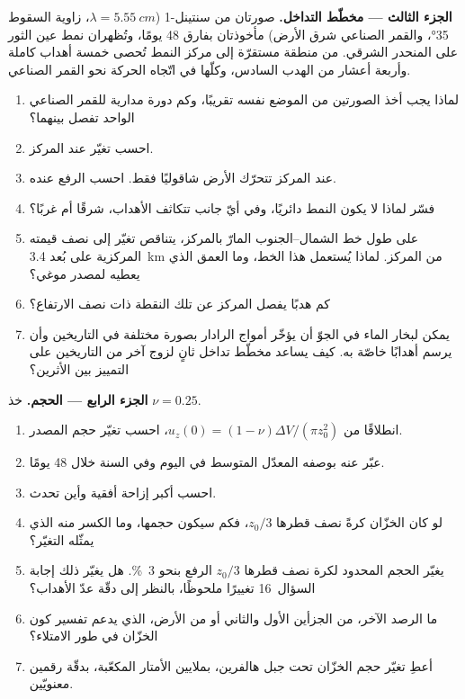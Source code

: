 \begin{problem}
\medskip\noindent\textbf{الجزء الثالث --- مخطّط التداخل.} صورتان من سنتينل-1
($\lambda = \qty{5.55}{cm}$، زاوية السقوط \ang{35}، والقمر الصناعي شرق
الأرض) مأخوذتان بفارق 48 يومًا، وتُظهران نمط عين الثور على المنحدر الشرقي.
من منطقة مستقرّة إلى مركز النمط تُحصى خمسة أهداب كاملة وأربعة أعشار
من الهدب السادس، وكلّها في اتّجاه الحركة نحو
القمر الصناعي.
\begin{enumerate}[resume]
\item لماذا يجب أخذ الصورتين من الموضع نفسه تقريبًا، وكم
  دورة مدارية للقمر الصناعي الواحد تفصل بينهما؟
\item احسب تغيّر  عند المركز.
\item عند المركز تتحرّك الأرض شاقوليًا فقط. احسب الرفع
  عنده.
\item فسّر لماذا لا يكون النمط دائريًا، وفي أيّ جانب تتكاثف الأهداب، شرقًا
  أم غربًا؟
\item على طول خط الشمال--الجنوب المارّ بالمركز، يتناقص تغيّر
   إلى نصف قيمته المركزية على بُعد \qty{3.4}{km} من
  المركز. لماذا يُستعمل هذا الخط، وما العمق الذي يعطيه لمصدر
  موغي؟
\item كم هدبًا يفصل المركز عن تلك النقطة ذات نصف الارتفاع؟
\item يمكن لبخار الماء في الجوّ أن يؤخّر أمواج الرادار بصورة مختلفة في
  التاريخين وأن يرسم أهدابًا خاصّة به. كيف يساعد مخطّط تداخل ثانٍ
  لزوج آخر من التاريخين على التمييز بين الأثرين؟
\end{enumerate}

\medskip\noindent\textbf{الجزء الرابع --- الحجم.} خذ $\nu = 0.25$.
\begin{enumerate}[resume]
\item انطلاقًا من $u_z(0) = (1 - \nu)\Delta V/(\pi z_0^2)$، احسب تغيّر
  حجم المصدر.
\item عبّر عنه بوصفه المعدّل المتوسط في اليوم وفي السنة خلال 48 يومًا.
\item احسب أكبر إزاحة أفقية وأين تحدث.
\item لو كان الخزّان كرةً نصف قطرها $z_0/3$، فكم سيكون
  حجمها، وما الكسر منه الذي يمثّله التغيّر؟
\item يغيّر الحجم المحدود لكرة نصف قطرها $z_0/3$ الرفع بنحو
  \qty{3}{\percent}. هل يغيّر ذلك إجابة السؤال~16
  تغييرًا ملحوظًا، بالنظر إلى دقّة عدّ الأهداب؟
\item ما الرصد الآخر، من الجزأين الأول والثاني أو من الأرض،
  الذي يدعم تفسير كون الخزّان في طور الامتلاء؟
\item أعطِ تغيّر حجم الخزّان تحت جبل هالفرين، بملايين
  الأمتار المكعّبة، بدقّة رقمين معنويّين.
\end{enumerate}
\end{problem}
